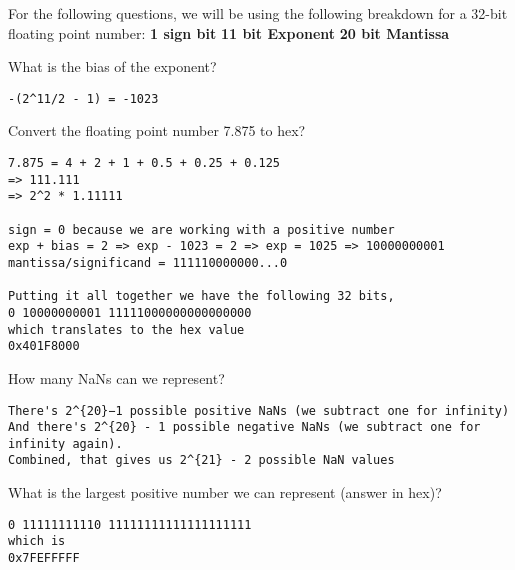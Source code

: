 For the following questions, we will be using the following breakdown for a 32-bit floating point number:
\newline
\textbf{1 sign bit}
\newline
\textbf{11 bit Exponent}
\newline
\textbf{20 bit Mantissa}
\newline

\newline
\begin{blocksection}
\question What is the bias of the exponent?
\newline \newline 
\begin{solution}
\begin{verbatim}
-(2^11/2 - 1) = -1023
\end{verbatim}
\end{solution}
\question Convert the floating point number 7.875 to hex?
\newline \newline \newline \newline \newline \newline \newline
\begin{solution}
\begin{verbatim}
7.875 = 4 + 2 + 1 + 0.5 + 0.25 + 0.125
=> 111.111 
=> 2^2 * 1.11111

sign = 0 because we are working with a positive number
exp + bias = 2 => exp - 1023 = 2 => exp = 1025 => 10000000001
mantissa/significand = 111110000000...0

Putting it all together we have the following 32 bits,
0 10000000001 11111000000000000000
which translates to the hex value
0x401F8000
\end{verbatim}
\end{solution}
\question How many NaNs can we represent?
\newline \newline \newline \newline \newline
\begin{solution}
\begin{verbatim}
There's 2^{20}−1 possible positive NaNs (we subtract one for infinity)
And there's 2^{20} - 1 possible negative NaNs (we subtract one for infinity again). 
Combined, that gives us 2^{21} - 2 possible NaN values
\end{verbatim}
\end{solution}
\question What is the largest positive number we can represent (answer in hex)?
\newline \newline \newline
\begin{solution}
\begin{verbatim}
0 11111111110 11111111111111111111
which is
0x7FEFFFFF
\end{verbatim}
\end{solution}




\end{blocksection}

